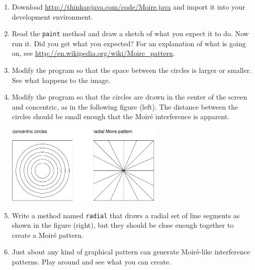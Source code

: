 \begin{exercise}
\begin{enumerate}

\item Download
\url{http://thinkapjava.com/code/Moire.java} and import it into
your development environment.

\item Read the {\tt paint} method and draw a sketch of
what you expect it to do.  Now run it.  Did you get what you
expected?  For an explanation of what is going on, see
\url{http://en.wikipedia.org/wiki/Moire_pattern}.

\item Modify the program so that the space between the circles is
larger or smaller.  See what happens to the image.

\item Modify the program so that the circles are drawn in the center
of the screen and concentric, as in the following figure (left).
The distance between the circles should be small enough
that the Moir\'{e} interference is apparent.

\includegraphics[height=1.5in]{figs/moire.pdf}

\item Write a method named {\tt radial} that draws a radial set
of line segments as shown in the figure (right), but they should be close
enough together to create a Moir\'{e} pattern.

\item Just about any kind of graphical pattern can generate
Moir\'{e}-like interference patterns.  Play around and see what you
can create.

\end{enumerate}
\end{exercise}


